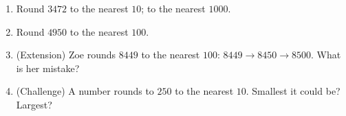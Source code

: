 \documentclass{beamer}
\newcommand{\ashow}[1]{\uncover<2->{\textcolor{red}{\small #1}}}
\begin{document}
\begin{frame}
\begin{columns}[T]
\begin{multicols}{2}
\begin{enumerate}
  \item Round $3472$ to the nearest $10$; to the nearest $1000$. \ashow{$3470$ and $3000$}

  \columnbreak

  \item Round $4950$ to the nearest $100$. \ashow{$5000$}

  \item (Extension) Zoe rounds $8449$ to the nearest $100$: $8449\to 8450\to 8500$. What is her mistake? \ashow{Rounded twice: only the tens digit $4$ counts, so $8400$}

  \item (Challenge) A number rounds to $250$ to the nearest $10$. Smallest it could be? Largest? \ashow{$245$ and $254$}

\end{enumerate}
\end{multicols}

\end{columns}

\end{frame}
\end{document}
